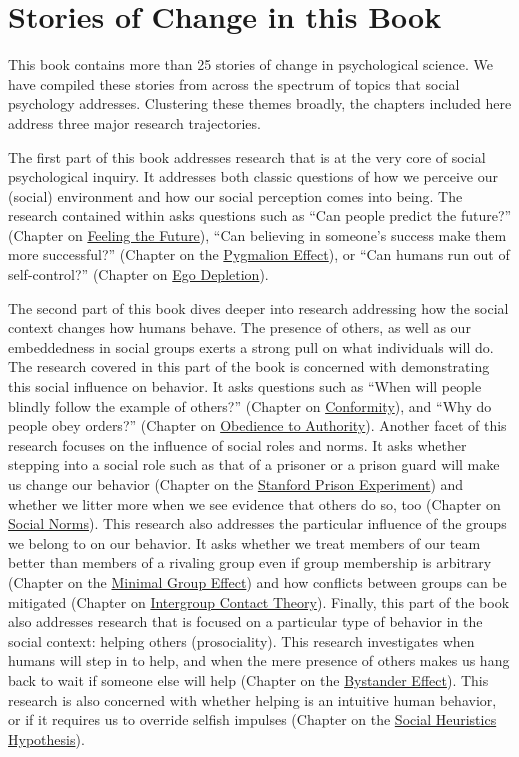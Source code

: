 \documentclass[
  letterpaper,
]{book}
\begin{document}
\section*{Stories of Change in this
Book}\label{stories-of-change-in-this-book}


This book contains more than 25 stories of change in psychological
science. We have compiled these stories from across the spectrum of
topics that social psychology addresses. Clustering these themes
broadly, the chapters included here address three major research
trajectories.

The first part of this book addresses research that is at the very core
of social psychological inquiry. It addresses both classic questions of
how we perceive our (social) environment and how our social perception
comes into being. The research contained within asks questions such as
``Can people predict the future?'' (Chapter on
\href{chapter6.qmd}{Feeling the Future}), ``Can believing in someone's
success make them more successful?'' (Chapter on the
\href{chapter2.qmd}{Pygmalion Effect}), or ``Can humans run out of
self-control?'' (Chapter on \href{chapter5.qmd}{Ego Depletion}).

The second part of this book dives deeper into research addressing how
the social context changes how humans behave. The presence of others, as
well as our embeddedness in social groups exerts a strong pull on what
individuals will do. The research covered in this part of the book is
concerned with demonstrating this social influence on behavior. It asks
questions such as ``When will people blindly follow the example of
others?'' (Chapter on \href{chapter21.qmd}{Conformity}), and ``Why do
people obey orders?'' (Chapter on \href{chapter4.qmd}{Obedience to
Authority}). Another facet of this research focuses on the influence of
social roles and norms. It asks whether stepping into a social role such
as that of a prisoner or a prison guard will make us change our behavior
(Chapter on the \href{chapter10.qmd}{Stanford Prison Experiment}) and
whether we litter more when we see evidence that others do so, too
(Chapter on \href{chapter22.qmd}{Social Norms}). This research also
addresses the particular influence of the groups we belong to on our
behavior. It asks whether we treat members of our team better than
members of a rivaling group even if group membership is arbitrary
(Chapter on the \href{chapter9.qmd}{Minimal Group Effect}) and how
conflicts between groups can be mitigated (Chapter on
\href{chapter12.qmd}{Intergroup Contact Theory}). Finally, this part of
the book also addresses research that is focused on a particular type of
behavior in the social context: helping others (prosociality). This
research investigates when humans will step in to help, and when the
mere presence of others makes us hang back to wait if someone else will
help (Chapter on the \href{chapter13.qmd}{Bystander Effect}). This
research is also concerned with whether helping is an intuitive human
behavior, or if it requires us to override selfish impulses (Chapter on
the \href{chapter14.qmd}{Social Heuristics Hypothesis}).
\end{document}

